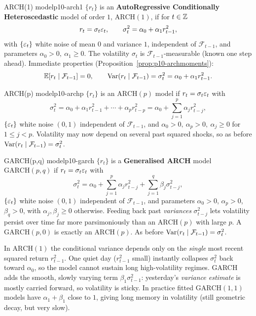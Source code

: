 \begin{definition}{ARCH(1) model}{p10-arch1}
$\{r_t\}$ is an \textbf{AutoRegressive Conditionally Heteroscedastic} model of
order $1$, $\mathrm{ARCH}(1)$, if for $t\in\mathbb{Z}$
\[
r_t=\sigma_t\varepsilon_t,\qquad \sigma_t^2=\alpha_0+\alpha_1 r_{t-1}^2,
\]
with $\{\varepsilon_t\}$ white noise of mean $0$ and variance $1$, independent of
$\mathcal F_{t-1}$, and parameters $\alpha_0>0,\ \alpha_1\ge 0$. The volatility
$\sigma_t$ is $\mathcal F_{t-1}$-measurable (known one step ahead). Immediate
properties (Proposition~\ref{prop:p10-archmoments}):
\[
\mathbb{E}[r_t\mid\mathcal F_{t-1}]=0,\qquad
\operatorname{Var}(r_t\mid\mathcal F_{t-1})=\sigma_t^2=\alpha_0+\alpha_1 r_{t-1}^2 .
\]
\end{definition}

\begin{definition}{ARCH(p) model}{p10-archp}
$\{r_t\}$ is an $\mathrm{ARCH}(p)$ model if $r_t=\sigma_t\varepsilon_t$ with
\[
\sigma_t^2=\alpha_0+\alpha_1 r_{t-1}^2+\cdots+\alpha_p r_{t-p}^2
=\alpha_0+\sum_{j=1}^{p}\alpha_j r_{t-j}^2,
\]
$\{\varepsilon_t\}$ white noise $(0,1)$ independent of $\mathcal F_{t-1}$, and
$\alpha_0>0,\ \alpha_p>0,\ \alpha_j\ge0$ for $1\le j<p$. Volatility may now
depend on several past squared shocks, so as before
$\operatorname{Var}(r_t\mid\mathcal F_{t-1})=\sigma_t^2$.
\end{definition}

\begin{definition}{GARCH(p,q) model}{p10-garch}
$\{r_t\}$ is a \textbf{Generalised ARCH} model $\mathrm{GARCH}(p,q)$ if
$r_t=\sigma_t\varepsilon_t$ with
\[
\sigma_t^2=\alpha_0+\sum_{j=1}^{p}\alpha_j r_{t-j}^2+\sum_{j=1}^{q}\beta_j\sigma_{t-j}^2,
\]
$\{\varepsilon_t\}$ white noise $(0,1)$ independent of $\mathcal F_{t-1}$, and parameters
$\alpha_0>0$, $\alpha_p>0$, $\beta_q>0$, with $\alpha_j,\beta_j\ge0$ otherwise.
Feeding back past \emph{variances} $\sigma_{t-j}^2$ lets volatility persist over
time far more parsimoniously than an $\mathrm{ARCH}(p)$ with large $p$. A
$\mathrm{GARCH}(p,0)$ is exactly an $\mathrm{ARCH}(p)$. As before
$\operatorname{Var}(r_t\mid\mathcal F_{t-1})=\sigma_t^2$.
\end{definition}

\begin{intuition}
In $\mathrm{ARCH}(1)$ the conditional variance depends only on the \emph{single}
most recent squared return $r_{t-1}^2$. One quiet day ($r_{t-1}^2$ small)
instantly collapses $\sigma_t^2$ back toward $\alpha_0$, so the model cannot
sustain long high-volatility regimes. GARCH adds the smooth, slowly varying term
$\beta_1\sigma_{t-1}^2$: yesterday's \emph{variance estimate} is mostly carried
forward, so volatility is sticky. In practice fitted $\mathrm{GARCH}(1,1)$ models
have $\alpha_1+\beta_1$ close to $1$, giving long memory in volatility (still
geometric decay, but very slow).
\end{intuition}

